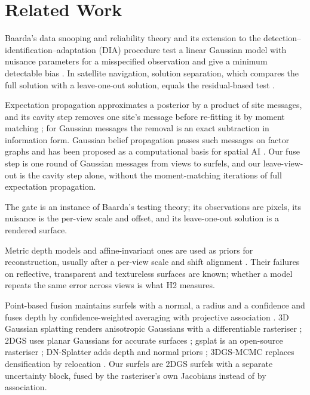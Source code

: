 \section{Related Work}
\label{sup:related}

 Baarda's data snooping and reliability theory and
its extension to the detection--identification--adaptation (DIA) procedure test a linear Gaussian
model with nuisance parameters for a misspecified observation and give a minimum detectable bias
\cite{stat_teunissen_dia}. In satellite navigation, solution separation, which compares the full
solution with a leave-one-out solution, equals the residual-based test \cite{flt_raim_joerger}.

 Expectation propagation approximates a posterior by a product of site
messages, and its cavity step removes one site's message before re-fitting it by moment matching
\cite{mp_minka_ep}; for Gaussian messages the removal is an exact subtraction in information form.
Gaussian belief propagation passes such messages on factor graphs and has been proposed as a
computational basis for spatial AI \cite{mp_davison_gbp}. Our fuse step is one round of Gaussian messages
from views to surfels, and our leave-view-out is the cavity step alone, without the moment-matching
iterations of full expectation propagation.

 The gate is an instance of Baarda's testing theory; its observations are pixels,
its nuisance is the per-view scale and offset, and its leave-one-out solution is a rendered surface.

 Metric depth models \cite{est_metric3dv2,est_unidepth,est_depthpro} and
affine-invariant ones \cite{est_midas,est_dav2,est_marigold,est_moge} are used as priors for
reconstruction, usually after a per-view scale and shift alignment \cite{rec_monosdf}. Their
failures on reflective, transparent and textureless surfaces are known; whether a model repeats the
same error across views is what H2 measures.

 Point-based fusion maintains surfels with a normal, a radius
and a confidence and fuses depth by confidence-weighted averaging with projective association
\cite{fus_keller_surfels}. 3D Gaussian splatting renders anisotropic Gaussians with a differentiable rasteriser
\cite{gs_3dgs}; 2DGS uses planar Gaussians for accurate surfaces \cite{gs_2dgs}; gsplat is an
open-source rasteriser \cite{gs_gsplat}; DN-Splatter adds depth and normal priors \cite{gs_dnsplatter};
3DGS-MCMC replaces densification by relocation \cite{gs_mcmc}. Our surfels are 2DGS surfels with a
separate uncertainty block, fused by the rasteriser's own Jacobians instead of by association.

